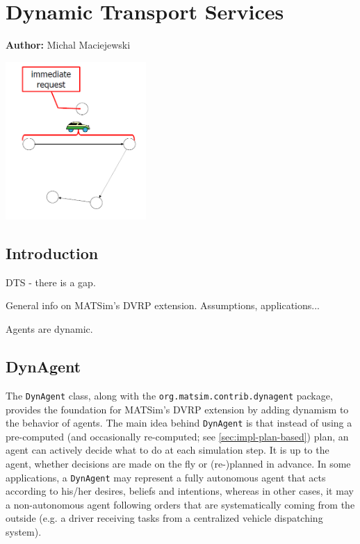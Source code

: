 \chapter{Dynamic Transport Services }
\label{ch:dts}

\hfill \textbf{Author:} Michal Maciejewski

\begin{center} \includegraphics[width=0.4\textwidth, angle=0]{extending/figures/DTS/dts.png}  \end{center}

\section{Introduction}

DTS - there is a gap.

General info on MATSim's DVRP extension. Assumptions, applications...

Agents are dynamic.

\section{DynAgent}

The \lstinline$DynAgent$ class, along with the \lstinline$org.matsim.contrib.dynagent$ package, provides the foundation for MATSim's DVRP extension by adding dynamism to the behavior of agents. The main idea behind \lstinline$DynAgent$ is that instead of using a pre-computed (and occasionally re-computed; see \ref{sec:impl-plan-based}) plan, an agent can actively decide what to do at each simulation step. It is up to the agent, whether decisions are made on the fly or (re-)planned in advance. In some applications, a \lstinline$DynAgent$ may represent a fully autonomous agent that acts according to his/her desires, beliefs and intentions, whereas in other cases, it may a non-autonomous agent following orders that are systematically coming from the outside (e.g. a driver receiving tasks from a centralized vehicle dispatching system).

